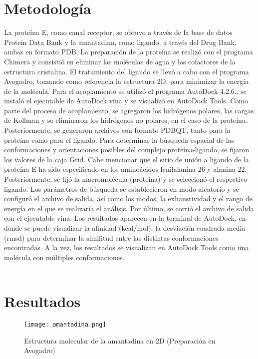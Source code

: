 \documentclass[12 pt]{article}
\begin{document}
\section{Metodología}
La proteína E, como canal receptor, se obtuvo a través de la base de datos Protein Data Bank y la amantadina, como ligando, a través del Drug Bank, ambas en formato PDB. La preparación de la proteína se realizó con el programa Chimera y consistió en eliminar las moléculas de agua y los cofactores de la estructura cristalina. El tratamiento del ligando se llevó a cabo con el programa Avogadro, tomando como referencia la estructura 2D, para minimizar la energía de la molécula. Para el acoplamiento se utilizó el programa AutoDock 4.2.6., se instaló el ejecutable de AutoDock vina y se visualizó en AutoDock Tools. Como parte del proceso de acoplamiento, se agregaron los hidrógenos polares, las cargas de Kollman y se eliminaron los hidrógenos no polares, en el caso de la proteína. Posteriormente, se generaron archivos con formato PDBQT, tanto para la proteína como para el ligando. Para determinar la búsqueda espacial de las conformaciones y orientaciones posibles del complejo proteína-ligando, se fijaron los valores de la caja Grid. Cabe mencionar que el sitio de unión a ligando de la proteína E ha sido especificado en los aminoácidos fenilalanina 26 y alanina 22\citep{abreu2020amantadine}. Posteriormente, se fijó la macromolécula (proteína) y se seleccionó el respectivo ligando. Los parámetros de búsqueda se establecieron en modo aleatorio y se configuró el archivo de salida, así como los modos, la exhaustividad y el rango de energía en el que se realizaría el análisis. Por último, se corrió el archivo de salida con el ejecutable vina. Los resultados aparecen en la terminal de AutoDock, en donde se puede visualizar la afinidad (kcal/mol), la desviación cuadrada media (rmsd) para determinar la similitud entre las distintas conformaciones encontradas. A la vez, los resultados se visualizan en AutoDock Tools como una molécula con múltiples conformaciones.\\\\


\section{Resultados}

    \begin{figure}[ht]
    \centering
    \texttt{[image: amantadina.png]}
    \caption{Estructura molecular de la amantadina en 2D (Preparación en Avogadro)}
    \label{fig:amantadina}
    \end{figure}
    
\end{document}
